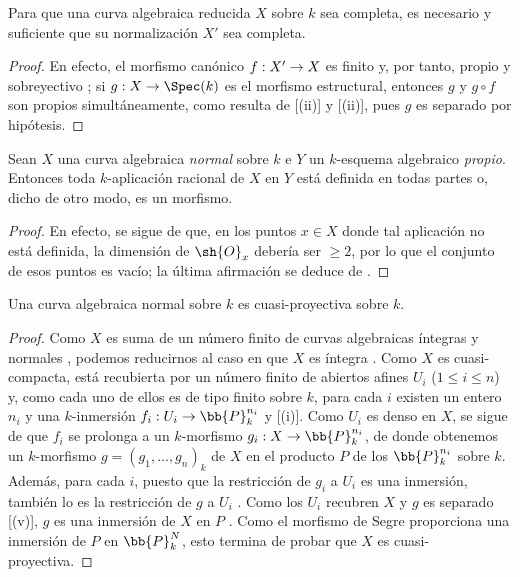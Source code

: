 \documentclass[oneside,10pt]{amsart}
\makeatletter
\renewcommand{\leq}{\leqslant}
\renewcommand{\geq}{\geqslant}
\newcommand{\ega@arrow}[2]{\mathchoice{#1}{#2}{#2}{#2}}
\renewcommand{\to}{\ega@arrow{\longrightarrow}{\rightarrow}}
\newcommand{\oldpage}[2][]{\marginnote{\normalfont\footnotesize\textbf{#1}~|~#2}\ignorespaces}
\let\EGAOriginalLabel\label
\renewcommand{\label}[1]{\phantomsection\EGAOriginalLabel{#1}}
\makeatother
\begin{document}
\begin{corollary}[7.4.8]
\label{II.7.4.8}
Para que una curva algebraica reducida $X$ sobre $k$ sea completa, es necesario y suficiente que su normalización $X'$ sea completa.
\end{corollary}

\oldpage[II]{150}
\begin{proof}
En efecto, el morfismo canónico $f:X'\to X$ es finito  y, por tanto, propio  y sobreyectivo ;
si $g:X\to\Spec(k)$ es el morfismo estructural, entonces $g$ y $g\circ f$ son propios simultáneamente, como resulta de [(ii)] y [(ii)], pues $g$ es separado por hipótesis.
\end{proof}

\begin{proposition}[7.4.9]
\label{II.7.4.9}
Sean $X$ una curva algebraica \emph{normal} sobre $k$ e $Y$ un $k$-esquema algebraico \emph{propio}.
Entonces toda $k$-aplicación racional de $X$ en $Y$ está definida en todas partes o, dicho de otro modo, es un morfismo.
\end{proposition}

\begin{proof}
En efecto, se sigue de  que, en los puntos $x\in X$ donde tal aplicación no está definida, la dimensión de $\sh{O}_x$ debería ser $\geq2$, por lo que el conjunto de esos puntos es vacío;
la última afirmación se deduce de .
\end{proof}

\begin{corollary}[7.4.10]
\label{II.7.4.10}
Una curva algebraica normal sobre $k$ es cuasi-proyectiva sobre $k$.
\end{corollary}

\begin{proof}
Como $X$ es suma de un número finito de curvas algebraicas íntegras y normales , podemos reducirnos al caso en que $X$ es íntegra .
Como $X$ es cuasi-compacta, está recubierta por un número finito de abiertos afines $U_i$ ($1\leq i\leq n$) y, como cada uno de ellos es de tipo finito sobre $k$, para cada $i$ existen un entero $n_i$ y una $k$-inmersión $f_i:U_i\to\bb{P}_k^{n_i}$  y [(i)].
Como $U_i$ es denso en $X$, se sigue de  que $f_i$ se prolonga a un $k$-morfismo $g_i:X\to\bb{P}_k^{n_i}$, de donde obtenemos un $k$-morfismo $g=(g_1,\ldots,g_n)_k$ de $X$ en el producto $P$ de los $\bb{P}_k^{n_i}$ sobre $k$.
Además, para cada $i$, puesto que la restricción de $g_i$ a $U_i$ es una inmersión, también lo es la restricción de $g$ a $U_i$ .
Como los $U_i$ recubren $X$ y $g$ es separado [(v)], $g$ es una inmersión de $X$ en $P$ .
Como el morfismo de Segre  proporciona una inmersión de $P$ en $\bb{P}_k^N$, esto termina de probar que $X$ es cuasi-proyectiva.
\end{proof}
\end{document}
